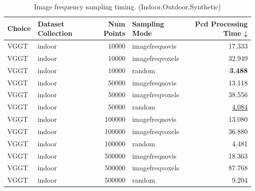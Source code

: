 \begin{table}[H]
\caption{\ifdefined\customcaption \customcaption \else Image frequency sampling timing. (Indoor,Outdoor,Synthetic) \fi}
\label{tab:03_sampling_mode_single_timing_indoor,outdoor,synthetic}
\centering
\scriptsize
\begin{tabular}{llrlr}
\toprule
Choice & Dataset Collection & Num Points & Sampling Mode & Pcd Processing Time ↓ \\
\midrule
VGGT & indoor & 10000 & imagefreqnovis & 17.333 \\
VGGT & indoor & 10000 & imagefreqvoxels & 32.949 \\
VGGT & indoor & 10000 & random & \textbf{3.488} \\
VGGT & indoor & 50000 & imagefreqnovis & 13.118 \\
VGGT & indoor & 50000 & imagefreqvoxels & 38.556 \\
VGGT & indoor & 50000 & random & \underline{4.084} \\
VGGT & indoor & 100000 & imagefreqnovis & 13.080 \\
VGGT & indoor & 100000 & imagefreqvoxels & 36.880 \\
VGGT & indoor & 100000 & random & 4.481 \\
VGGT & indoor & 500000 & imagefreqnovis & 18.363 \\
VGGT & indoor & 500000 & imagefreqvoxels & 87.768 \\
VGGT & indoor & 500000 & random & 9.204 \\
\bottomrule
\end{tabular}
\end{table}